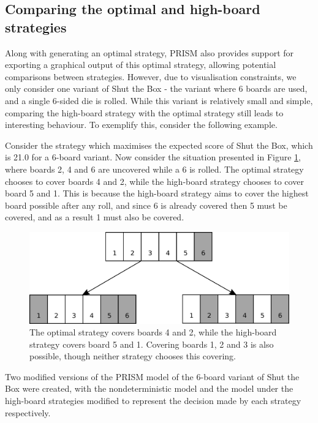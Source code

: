 \subsection{Comparing the optimal and high-board strategies}
\label{cs1:compare-strats}
Along with generating an optimal strategy, PRISM also provides support for exporting a graphical output of this optimal strategy, allowing potential comparisons between strategies. However, due to visualisation constraints, we only consider one variant of Shut the Box - the variant where 6 boards are used, and a single 6-sided die is rolled. While this variant is relatively small and simple, comparing the high-board strategy with the optimal strategy still leads to interesting behaviour. To exemplify this, consider the following example.

\begin{example}
\label{cs1:greedy-optimal}

Consider the strategy which maximises the expected score of Shut the Box, which is 21.0 for a 6-board variant. Now consider the situation presented in Figure \ref{cs1:optimal_high_board}, where boards 2, 4 and 6 are uncovered while a 6 is rolled. The optimal strategy chooses to cover boards 4 and 2, while the high-board strategy chooses to cover board 5 and 1. This is because the high-board strategy aims to cover the highest board possible after any roll, and since 6 is already covered then 5 must be covered, and as a result 1 must also be covered.

\begin{figure}
    \centering
    \includegraphics[width=\textwidth]{images/ShutTheBox/optimal_high_board.pdf}
    \caption{The optimal strategy covers boards 4 and 2, while the high-board strategy covers board 5 and 1. Covering boards 1, 2 and 3 is also possible, though neither strategy chooses this covering.}
\label{cs1:optimal_high_board}
\end{figure}

Two modified versions of the PRISM model of the 6-board variant of Shut the Box were created, with the nondeterministic model and the model under the high-board strategies modified to represent the decision made by each strategy respectively.


\end{example}
